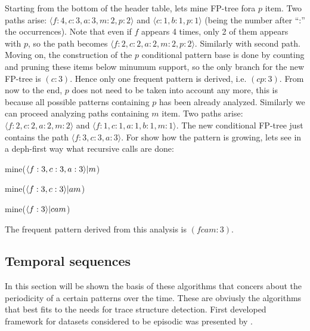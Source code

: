 Starting from the bottom of the header table, lets mine FP-tree fora $p$ item. Two
paths arise: $\langle f:4,c:3,a:3,m:2,p:2 \rangle$ and $\langle c:1, b:1, p:1
\rangle$ (being the number after ``:'' the occurrences). Note that even if $f$
appears 4 times, only 2 of them appears with $p$, so the path becomes $\langle 
f:2,c:2,a:2,m:2,p:2 \rangle$. Similarly with second path. Moving on, the
construction of the $p$ conditional pattern base is done by counting and pruning
these items below minumum support, so the only branch for the new FP-tree is
$(c:3)$. Hence only one frequent pattern is derived, i.e. $(cp:3)$. From now to
the end, $p$ does not need to be taken into account any more, this is because
all possible patterns containing $p$ has been already analyzed. Similarly we can proceed analyzing paths containing $m$ item. Two paths arise: 
$\langle f:2,c:2,a:2,m:2 \rangle$ and $\langle f:1,c:1,a:1,b:1,m:1 \rangle$. The
new conditional FP-tree just contains the path $\langle f:3,c:3,a:3 \rangle$.
For show how the pattern is growing, lets see in a deph-first way what
recursive calls are done:
\begin{enumerate*}[label=(\roman*)]
  \item mine($\langle f:3,c:3,a:3 \rangle \text{\textbar} m$)
  \item mine($\langle f:3,c:3 \rangle \text{\textbar} am$)
  \item mine($\langle f:3 \rangle \text{\textbar} cam$)
\end{enumerate*}
The frequent pattern derived from this analysis is $(fcam:3)$.

\subsection{Temporal sequences}\label{ss:temporal_sequences}

In this section will be shown the basis of these algorithms that concers about
the periodicity of a certain patterns over the time. These are obviusly the
algorithms that best fits to the needs for trace structure detection. First
developed framework for datasets considered to be episodic was presented by
\cite{mannila1995discovering}.

